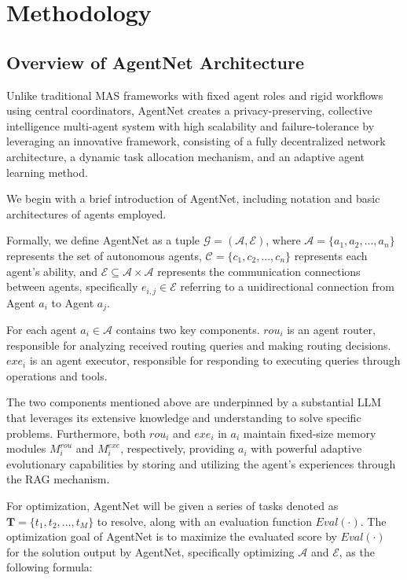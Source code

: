 \documentclass{article}
\begin{document}
\section{Methodology}
\subsection{Overview of AgentNet Architecture}
Unlike traditional MAS frameworks with fixed agent roles and rigid workflows using central coordinators, AgentNet creates a privacy-preserving, collective intelligence multi-agent system with high scalability and failure-tolerance by leveraging an innovative framework, consisting of a fully decentralized network architecture, a dynamic task allocation mechanism, and an adaptive agent learning method.

We begin with a brief introduction of AgentNet, including notation and basic architectures of agents employed. 

Formally, we define AgentNet as a tuple $\mathcal{G} = (\boldsymbol{\mathcal{A}}, \boldsymbol{\mathcal{E}})$, where $\boldsymbol{\mathcal{A}} = \{a_1, a_2, ..., a_n\}$ represents the set of autonomous agents, $\boldsymbol{\mathcal{C}} = \{c_1, c_2, ..., c_n\}$ represents each agent's ability, and $\boldsymbol{\mathcal{E}} \subseteq \boldsymbol{\mathcal{A}} \times \boldsymbol{\mathcal{A}}$ represents the communication connections between agents, specifically $e_{i,j}\in \boldsymbol{\mathcal{E}}$ referring to a unidirectional connection from Agent $a_i$ to Agent $a_j$.

For each agent $a_i \in \boldsymbol{\mathcal{A}}$ contains two key components. $rou_i$ is an agent router, responsible for analyzing received routing queries and making routing decisions. $exe_i$ is an agent executor, responsible for responding to executing queries through operations and tools. 

The two components mentioned above are underpinned by a substantial LLM that leverages its extensive knowledge and understanding to solve specific problems. Furthermore, both $rou_i$ and $exe_i$ in $a_i$ maintain fixed-size memory modules $M_i^{rou}$ and $M_i^{exe}$, respectively, providing $a_i$ with powerful adaptive evolutionary capabilities by storing and utilizing the agent's experiences through the RAG mechanism. 

For optimization, AgentNet will be given a series of tasks denoted as $\boldsymbol{T}=\{t_1, t_2, ..., t_M\}$ to resolve, along with an evaluation function $Eval(\cdot)$. The optimization goal of AgentNet is to maximize the evaluated score by $Eval(\cdot)$ for the solution output by AgentNet, specifically optimizing $\boldsymbol{\mathcal{A}}$ and $\boldsymbol{\mathcal{E}}$, as the following formula:
\end{document}
